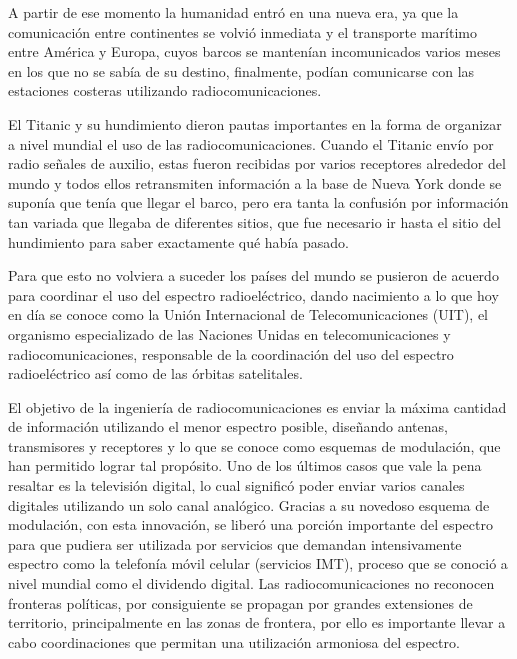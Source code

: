 A partir de ese momento la humanidad entró en una nueva era, ya que la comunicación entre continentes se volvió inmediata y el transporte marítimo entre América y Europa, cuyos barcos se mantenían incomunicados varios meses en los que no se sabía de su destino, finalmente, podían comunicarse con las estaciones costeras utilizando radiocomunicaciones.

El Titanic y su hundimiento dieron pautas importantes en la forma de organizar a nivel mundial el uso de las radiocomunicaciones. Cuando el Titanic envío por radio señales de auxilio, estas fueron recibidas por varios receptores alrededor del mundo y todos ellos retransmiten información a la base de Nueva York donde se suponía que tenía que llegar el barco, pero era tanta la confusión por información tan variada que llegaba de diferentes sitios, que fue necesario ir hasta el sitio del hundimiento para saber exactamente qué había pasado.

Para que esto no volviera a suceder los países del mundo se pusieron de acuerdo para coordinar el uso del espectro radioeléctrico, dando nacimiento a lo que hoy en día se conoce como la Unión Internacional de Telecomunicaciones (UIT), el organismo especializado de las Naciones Unidas en telecomunicaciones y radiocomunicaciones, responsable de la coordinación del uso del espectro radioeléctrico así como de las órbitas satelitales.

El objetivo de la ingeniería de radiocomunicaciones es enviar la máxima cantidad de información utilizando el menor espectro posible, diseñando antenas, transmisores y receptores y lo que se conoce como esquemas de modulación, que han permitido lograr tal propósito. Uno de los últimos casos que vale la pena resaltar es la televisión digital, lo cual significó poder enviar varios canales digitales utilizando un solo canal analógico. Gracias a su novedoso esquema de modulación, con esta innovación, se liberó una porción importante del espectro para que pudiera ser utilizada por servicios que demandan intensivamente espectro como la telefonía móvil celular (servicios IMT), proceso que se conoció a nivel mundial como el dividendo digital. Las radiocomunicaciones no reconocen fronteras políticas, por consiguiente se propagan por grandes extensiones de territorio, principalmente en las zonas de frontera, por ello es importante llevar a cabo coordinaciones que permitan una utilización armoniosa del espectro.

